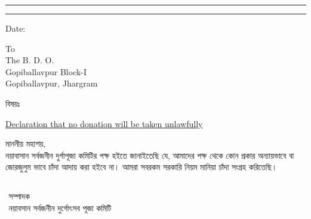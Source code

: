 \begin{center}
    \myheader
    \end{center}
    \hrule \vspace*{2pt} \hrule  \vspace*{20pt}
    \begin{adjustwidth}{15mm}{15mm}\large 
        \begin{flushright} 
            Date: \underline{\datecontainer}
        \end{flushright}\large\vspace{1cm}
        
        \noindent To\\
        The B. D. O.\\
        Gopiballavpur Block-I\\
        Gopiballavpur, Jhargram 
        
        \vspace{.5cm}
        
        \noindent\begin{minipage}{.1\textwidth}বিষয়ঃ 
        \end{minipage}\begin{minipage}{.8\textwidth} 
            \underline{
                Declaration that no donation will be taken unlawfully 
            }
        \end{minipage}
        \vspace{.5cm}
        
        \noindent মাননীয় মহাশয়,\\
        \hspace*{1.5cm} 
        নয়াবাসান সর্বজনীন দুর্গাপূজা কমিটির পক্ষ হইতে জানাইতেছি যে, আমাদের পক্ষ থেকে কোন প্রকার অন্যায়ভাবে বা জোরজুলুম ভাবে চাঁদা আদায় করা হইবে না।  আমরা সবরকম সরকারি নিয়ম মানিয়া চাঁদা সংগ্রহ করিতেছি।  \\ 
        
         
        
        
        \vspace{2ex}
        \begin{flushright}
            $\begin{array}{c}
            \\ \\ \\
            \mbox{সম্পাদক}\\\mbox{নয়াবসান সর্বজনীন দুর্গোৎসব পূজা কমিটি}\end{array}$
        \end{flushright}
    \end{adjustwidth}
    